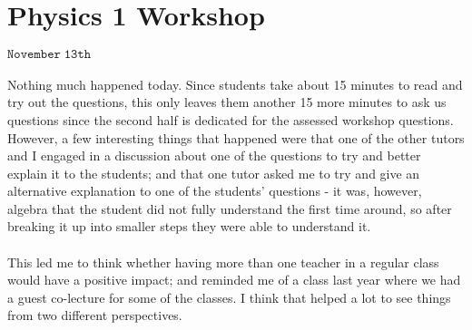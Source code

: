 \section{Physics 1 Workshop}
\begin{flushright}
$\mathtt{November \; 13th}$
\end{flushright}
\paragraph{}

Nothing much happened today. Since students take about 15 minutes to read and try out the questions, this only leaves them another 15 more minutes to ask us questions since the second half is dedicated for the assessed workshop questions. However, a few interesting things that happened were that one of the other tutors and I engaged in a discussion about one of the questions to try and better explain it to the students; and that one tutor asked me to try and give an alternative explanation to one of the students' questions - it was, however, algebra that the student did not fully understand the first time around, so after breaking it up into smaller steps they were able to understand it. 
\paragraph{}

This led me to think whether having more than one teacher in a regular class would have a positive impact; and reminded me of a class last year where we had a guest co-lecture for some of the classes. I think that helped a lot to see things from two different perspectives. 
